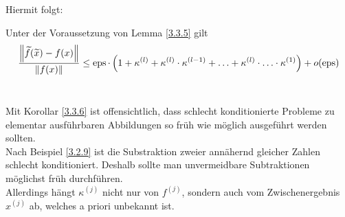 Hiermit folgt:

\begin{Kore}
  \label{3.3.6}
  Unter der Voraussetzung von Lemma \ref{3.3.5} gilt
  \begin{gather}
    \frac{\nn[\widetilde{f}(\widetilde{x})-f(x)]}{\nn[f(x)]} \leq 
    \Eps\cdot \left( 1+\kappa^{(l)}+ \kappa^{(l)}\cdot \kappa^{(l-1)}+ \dotsc
      + \kappa^{(l)}\cdot \dotsc \cdot \kappa^{(1)}\right) + o(\Eps) 
    \label{III.3.5}
  \end{gather}~
\end{Kore}

\begin{Beme}
  Mit Korollar \ref{3.3.6} ist offensichtlich, dass schlecht konditionierte Probleme 
  zu elementar ausführbaren Abbildungen so früh wie möglich ausgeführt werden sollten. \\
  Nach Beispiel \ref{3.2.9} ist die Substraktion zweier annähernd gleicher Zahlen schlecht konditioniert.
  Deshalb sollte man unvermeidbare Subtraktionen möglichst früh durchführen. \\
  Allerdings hängt $\kappa^{(j)}$ nicht nur von $f^{(j)}$, sondern auch vom 
  Zwischenergebnis $x^{(j)}$ ab, welches a priori unbekannt ist.
\end{Beme}

